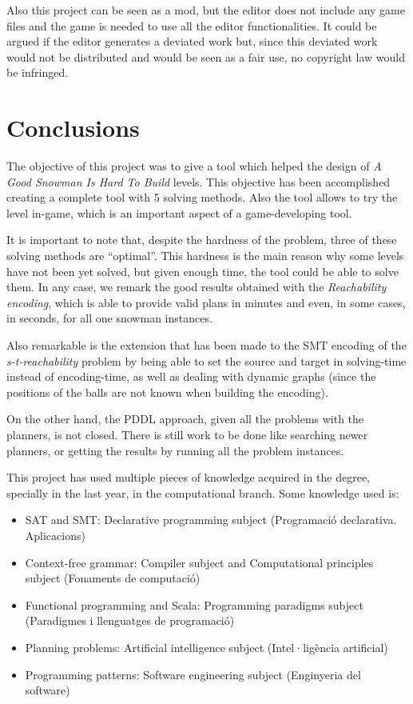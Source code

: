 \documentclass{report}
\theoremstyle{plain}
\begin{document}
Also this project can be seen as a mod, but the editor does not include any game files and the game is needed to use all the editor functionalities. It could be argued if the editor generates a deviated work but, since this deviated work would not be distributed and would be seen as a fair use, no copyright law would be infringed.

\chapter{Conclusions}
The objective of this project was to give a tool which helped the design of \emph{A Good Snowman Is Hard To Build} levels. This objective has been accomplished creating a complete tool with 5 solving methods. Also the tool allows to try the level in-game, which is an important aspect of a game-developing tool.

It is important to note that, despite the hardness of the problem, three of these solving methods are ``optimal''. This hardness is the main reason why some levels have not been yet solved, but given enough time, the tool could be able to solve them. In any case, we remark the good results obtained with the \emph{Reachability encoding}, which is  able to provide valid plans in minutes and even, in some cases, in seconds, for all one snowman instances.

Also remarkable is the extension that has been made to the SMT encoding of the \emph{s-t-reachability} problem by being able to set the source and target in solving-time instead of encoding-time, as well as dealing with dynamic graphs (since the positions of the balls are not known when building the encoding).

On the other hand, the PDDL approach, given all the problems with the planners, is not closed. There is still work to be done like searching newer planners, or getting the results by running all the problem instances.

This project has used multiple pieces of knowledge acquired in the degree, specially in the last year, in the computational branch. Some knowledge used is:
\begin{itemize}
    \item SAT and SMT: Declarative programming subject (Programació declarativa. Aplicacions)
    \item Context-free grammar: Compiler subject and Computational principles subject (Fonaments de computació)
    \item Functional programming and Scala: Programming paradigms subject (Paradigmes i llenguatges de programació)
    \item Planning problems: Artificial intelligence subject (Intel·ligència artificial)
    \item Programming patterns: Software engineering subject (Enginyeria del software)
\end{itemize}
\end{document}

